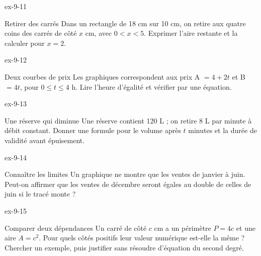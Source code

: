 \begin{blocLivre}{ex-9-11}\begin{exercice}[3]{Retirer des carrés}
Dans un rectangle de 18 cm sur 10 cm, on retire aux quatre coins des carrés de côté $x$ cm, avec $0<x<5$. Exprimer l’aire restante et la calculer pour $x=2$.
\label{fig-ex-9-11}
\end{exercice}\end{blocLivre}
\begin{blocLivre}{ex-9-12}\begin{exercice}[3]{Deux courbes de prix}
Les graphiques correspondent aux prix A $=4+2t$ et B $=4t$, pour $0\le t\le4$ h. Lire l’heure d’égalité et vérifier par une équation.
\label{fig-ex-9-12}
\end{exercice}\end{blocLivre}
\begin{blocLivre}{ex-9-13}\begin{exercice}[3]{Une réserve qui diminue}
Une réserve contient 120 L ; on retire 8 L par minute à débit constant. Donner une formule pour le volume après $t$ minutes et la durée de validité avant épuisement.
\label{fig-ex-9-13}
\end{exercice}\end{blocLivre}
\begin{blocLivre}{ex-9-14}\begin{exercice}[3]{Connaître les limites}
Un graphique ne montre que les ventes de janvier à juin. Peut-on affirmer que les ventes de décembre seront égales au double de celles de juin si le tracé monte ?
\end{exercice}\end{blocLivre}
\begin{blocLivre}{ex-9-15}\begin{exercice}[3]{Comparer deux dépendances}
Un carré de côté $c$ cm a un périmètre $P=4c$ et une aire $A=c^2$. Pour quels côtés positifs leur valeur numérique est-elle la même ? Chercher un exemple, puis justifier sans résoudre d’équation du second degré.
\label{fig-ex-9-15}
\end{exercice}\end{blocLivre}

\clearpage
